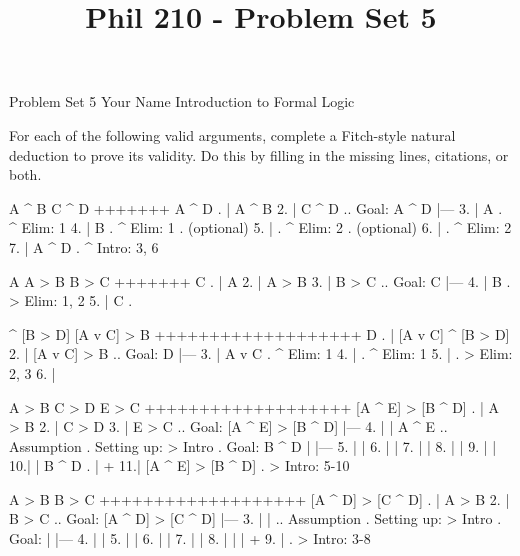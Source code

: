 
\title{Phil 210 - Problem Set 5}

\heading
Problem Set 5
Your Name
Introduction to Formal Logic
\endheading

For each of the following valid arguments, complete a Fitch-style natural deduction to prove its validity. Do this by filling in the missing lines, citations, or both.

\problems
{}
\argument
 A ^ B
 C ^ D
+++++++
 A ^ D
\endargument
        \answer
        . | A ^ B
         2. | C ^ D  ..  Goal: A ^ D
            |---
         3. | A      .  ^ Elim: 1
         4. | B      .  ^ Elim: 1  .  (optional)
         5. |        .  ^ Elim: 2  .  (optional)
         6. |        .  ^ Elim: 2
         7. | A ^ D  .  ^ Intro: 3, 6
        \endfitchproof
        \endanswer

\argument
 A
 A > B
 B > C
+++++++
 C
\endargument
        \answer
        . | A
         2. | A > B
         3. | B > C  ..  Goal: C
            |---
         4. | B      .  > Elim: 1, 2
         5. | C      .  
        \endfitchproof
        \endanswer

\argument
 [A v C] ^ [B > D]
 [A v C] > B
+++++++++++++++++++
 D
\endargument
        \answer
        . | [A v C] ^ [B > D]
         2. | [A v C] > B        ..  Goal: D
            |---
         3. | A v C              .  ^ Elim: 1
         4. |                    .  ^ Elim: 1
         5. |                    .  > Elim: 2, 3
         6. | 
        \endfitchproof
        \endanswer

\argument
 A > B
 C > D
 E > C
+++++++++++++++++++
 [A ^ E] > [B ^ D]
\endargument
        \answer
        . | A > B
         2. | C > D
         3. | E > C      ..  Goal: [A ^ E] > [B ^ D]
            |---
         4. |   | A ^ E  ..  Assumption  .  Setting up: > Intro  .  Goal: B ^ D
            |   |---
         5. |   | 
         6. |   | 
         7. |   | 
         8. |   | 
         9. |   | 
         10.|   | B ^ D   .  
            |   +
         11.| [A ^ E] > [B ^ D]  .  > Intro: 5-10
        \endfitchproof
        \endanswer

\argument
 A > B
 B > C
+++++++++++++++++++
 [A ^ D] > [C ^ D]
\endargument
        \answer
        . | A > B
         2. | B > C      ..  Goal: [A ^ D] > [C ^ D]
            |---
         3. |   |        ..  Assumption  .  Setting up: > Intro  .  Goal: 
            |   |---
         4. |   | 
         5. |   | 
         6. |   | 
         7. |   | 
         8. |   | 
            |   +
         9. |            .  > Intro: 3-8
        \endfitchproof
        \endanswer

